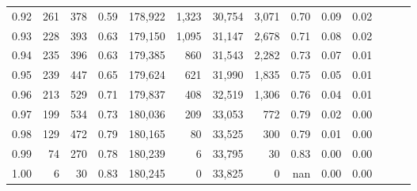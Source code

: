 \begin{tabular}{rrrrrrrrrrrrrr}
0.92 &    261 &  378 &  0.59 &  178,922 &    1,323 &  30,754 &   3,071 &  0.70 &  0.09 &      0.02 \\
0.93 &    228 &  393 &  0.63 &  179,150 &    1,095 &  31,147 &   2,678 &  0.71 &  0.08 &      0.02 \\
0.94 &    235 &  396 &  0.63 &  179,385 &      860 &  31,543 &   2,282 &  0.73 &  0.07 &      0.01 \\
0.95 &    239 &  447 &  0.65 &  179,624 &      621 &  31,990 &   1,835 &  0.75 &  0.05 &      0.01 \\
0.96 &    213 &  529 &  0.71 &  179,837 &      408 &  32,519 &   1,306 &  0.76 &  0.04 &      0.01 \\
0.97 &    199 &  534 &  0.73 &  180,036 &      209 &  33,053 &     772 &  0.79 &  0.02 &      0.00 \\
0.98 &    129 &  472 &  0.79 &  180,165 &       80 &  33,525 &     300 &  0.79 &  0.01 &      0.00 \\
0.99 &     74 &  270 &  0.78 &  180,239 &        6 &  33,795 &      30 &  0.83 &  0.00 &      0.00 \\
1.00 &      6 &   30 &  0.83 &  180,245 &        0 &  33,825 &       0 &   nan &  0.00 &      0.00 \\
\bottomrule
\end{tabular}
